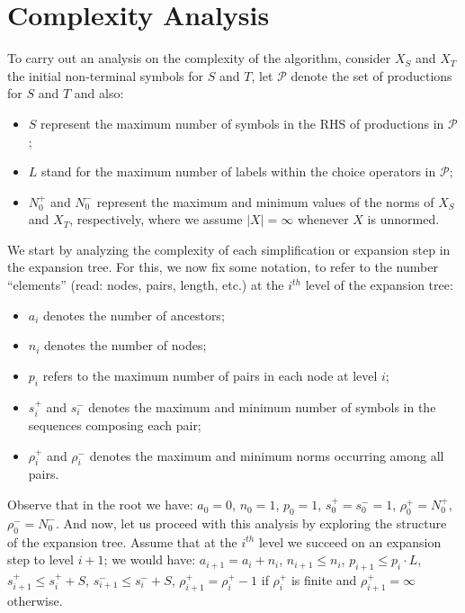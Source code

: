 \section{Complexity Analysis}
\label{sec:complexity}


To carry out an analysis on the complexity of the algorithm, 
consider $X_S$ and $X_T$ the initial non-terminal symbols for 
$S$ and $T$, let $\mathcal{P}$ denote the set of productions for 
$S$ and $T$ and also:
\begin{itemize}
	\item $S$ represent the maximum number of symbols in the RHS
	      of productions in $\mathcal{P}$;
	\item $L$ stand for the maximum number of labels within the choice 
		  operators in $\mathcal{P}$;
	\item $N_0^+$ and $N_0^-$ represent the maximum and minimum values
		  of the norms of $X_S$ and $X_T$, respectively, where we 
		  assume $|X|=\infty$ whenever $X$ is unnormed.
\end{itemize}

We start by analyzing the complexity of each simplification or expansion 
step in the expansion tree. For this, we now fix some notation, to 
refer to the number ``elements'' (read: nodes, pairs, length, etc.)
at the $i^{th}$ level of the expansion tree:
\begin{itemize}
	\item $a_i$ denotes the number of ancestors;
	\item $n_i$ denotes the number of nodes;
	\item $p_i$ refers to the maximum number of pairs in each node
				at level $i$;
	\item $s_i^+$ and $s_i^-$ denotes the maximum and minimum 
		  number of symbols in the sequences composing each pair;
	\item $\rho_i^+$ and $\rho_i^-$ denotes the maximum and minimum
		  norms occurring among all pairs.
\end{itemize}

Observe that in the root we have: $a_0=0$, $n_0=1$, $p_0=1$,
$s_0^+=s_0^-=1$, $\rho_0^+=N_0^+$, $\rho_0^-=N_0^-$. And now, let us proceed
with this analysis by exploring the structure of the expansion tree. Assume 
that at the $i^{th}$ level we succeed on an expansion step to
level $i+1$;
we would have: $a_{i+1}=a_i+n_i$, $n_{i+1}\leq n_i$, 
$p_{i+1}\leq p_i\cdot L$,
$s_{i+1}^+\leq s_i^++S$, $s_{i+1}^-\leq s_i^-+S$, $\rho_{i+1}^+=\rho_i^+-1$ 
if $\rho_i^+$ is finite and  $\rho_{i+1}^+ = \infty$ otherwise.

